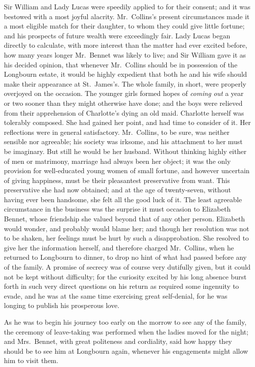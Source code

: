 \documentclass[12pt,english,oneside]{book}
\begin{document}
Sir William and Lady Lucas were speedily applied to for their consent;
and it was bestowed with a most joyful alacrity. Mr.\ Collins's present
circumstances made it a most eligible match for their daughter, to
whom they could give little fortune; and his prospects of future wealth
were exceedingly fair. Lady Lucas began directly to calculate, with
more interest than the matter had ever excited before, how many years
longer Mr.\ Bennet was likely to live; and Sir William gave it as
his decided opinion, that whenever Mr.\ Collins should be in possession
of the Longbourn estate, it would be highly expedient that both he
and his wife should make their appearance at St.\ James's. The whole
family, in short, were properly overjoyed on the occasion. The younger
girls formed hopes of \textit{coming} \textit{out} a year or two sooner
than they might otherwise have done; and the boys were relieved from
their apprehension of Charlotte's dying an old maid. Charlotte herself
was tolerably composed. She had gained her point, and had time to
consider of it. Her reflections were in general satisfactory. Mr.\ Collins,
to be sure, was neither sensible nor agreeable; his society was irksome,
and his attachment to her must be imaginary. But still he would be
her husband. Without thinking highly either of men or matrimony, marriage
had always been her object; it was the only provision for well-educated
young women of small fortune, and however uncertain of giving happiness,
must be their pleasantest preservative from want. This preservative
she had now obtained; and at the age of twenty-seven, without having
ever been handsome, she felt all the good luck of it. The least agreeable
circumstance in the business was the surprise it must occasion to
Elizabeth Bennet, whose friendship she valued beyond that of any other
person. Elizabeth would wonder, and probably would blame her; and
though her resolution was not to be shaken, her feelings must be hurt
by such a disapprobation. She resolved to give her the information
herself, and therefore charged Mr.\ Collins, when he returned to
Longbourn to dinner, to drop no hint of what had passed before any
of the family. A promise of secrecy was of course very dutifully given,
but it could not be kept without difficulty; for the curiosity excited
by his long absence burst forth in such very direct questions on his
return as required some ingenuity to evade, and he was at the same
time exercising great self-denial, for he was longing to publish his
prosperous love.

As he was to begin his journey too early on the morrow to see any
of the family, the ceremony of leave-taking was performed when the
ladies moved for the night; and Mrs.\ Bennet, with great politeness
and cordiality, said how happy they should be to see him at Longbourn
again, whenever his engagements might allow him to visit them.
\end{document}
